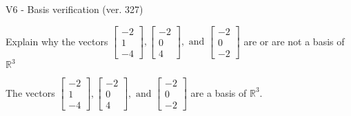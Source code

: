\begin{exercise}
  \begin{exerciseTitle}V6 - Basis verification (ver. 327)\end{exerciseTitle}
  \begin{exerciseStatement}
    Explain why the vectors \(\left[\begin{array}{r}
-2 \\
1 \\
-4
\end{array}\right] , \left[\begin{array}{r}
-2 \\
0 \\
4
\end{array}\right] , \text{ and } \left[\begin{array}{r}
-2 \\
0 \\
-2
\end{array}\right]\) are or are not a basis of \(\mathbb{R}^3\)	


  \end{exerciseStatement}
  \begin{exerciseAnswer}
   The vectors \(\left[\begin{array}{r}
-2 \\
1 \\
-4
\end{array}\right] , \left[\begin{array}{r}
-2 \\
0 \\
4
\end{array}\right] , \text{ and } \left[\begin{array}{r}
-2 \\
0 \\
-2
\end{array}\right]\) 
  	 are  a basis of \(\mathbb{R}^3\).
  


  \end{exerciseAnswer}
\end{exercise}
